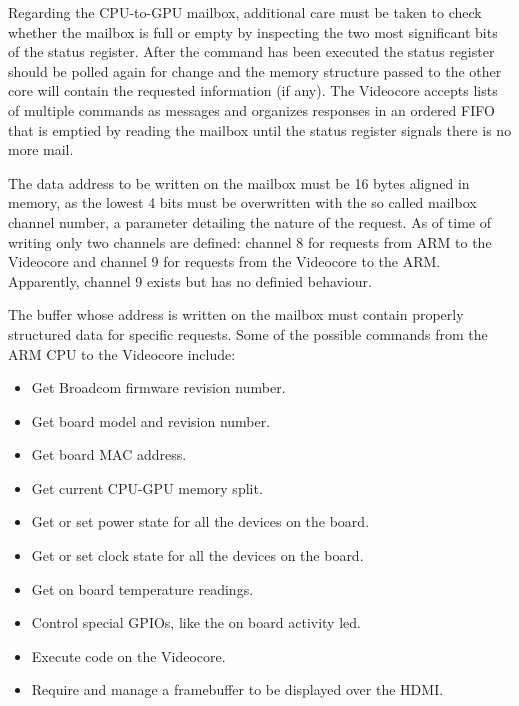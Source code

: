 \documentclass[12pt,a4paper,openright,twoside]{report}
\begin{document}
Regarding the CPU-to-GPU mailbox, additional care must be taken to check whether
the mailbox is full or empty by inspecting the two most significant bits of 
the status register.
After the command has been executed the status register should be polled again
for change and the memory structure passed to the other core will contain the
requested information (if any).
The Videocore accepts lists of multiple commands as messages and organizes
responses in an ordered FIFO that is emptied by reading the mailbox until 
the status register signals there is no more mail.

The data address to be written on the mailbox must be 16 bytes aligned in memory,
as the lowest 4 bits must be overwritten with the so called mailbox channel
number, a parameter detailing the nature of the request. As of time of writing
only two channels are defined: channel 8 for requests from ARM to the Videocore
and channel 9 for requests from the Videocore to the ARM. Apparently, channel 9
exists but has no definied behaviour.


The buffer whose address is written on the mailbox must contain properly structured
data for specific requests. Some of the possible commands from the ARM CPU to the
Videocore include:
\begin{itemize}
    \item Get Broadcom firmware revision number.
    \item Get board model and revision number.
    \item Get board MAC address.
    \item Get current CPU-GPU memory split.
    \item Get or set power state for all the devices on the board.
    \item Get or set clock state for all the devices on the board.
    \item Get on board temperature readings.
    \item Control special GPIOs, like the on board activity led.
    \item Execute code on the Videocore.
    \item Require and manage a framebuffer to be displayed over the HDMI.
\end{itemize}
\end{document}
